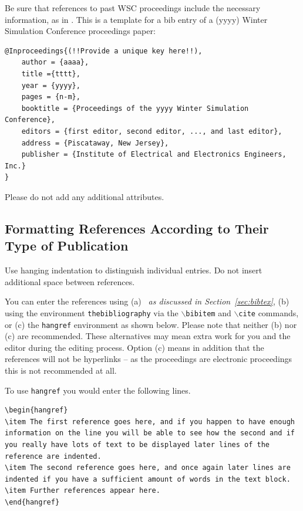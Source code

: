 \documentclass{wscpaperproc}
\theoremstyle{wsc}
\begin{document}
Be sure that references to past WSC proceedings include the necessary information, as in . 
This is a template for a bib entry of a (yyyy) Winter Simulation Conference proceedings paper:\newline

\begin{verbatim}
@Inproceedings{(!!Provide a unique key here!!),
	author = {aaaa},
	title ={tttt},
	year = {yyyy},
	pages = {n-m},
	booktitle = {Proceedings of the yyyy Winter Simulation Conference},
	editors = {first editor, second editor, ..., and last editor},
	address = {Piscataway, New Jersey},
	publisher = {Institute of Electrical and Electronics Engineers, Inc.}
}
\end{verbatim}\vspace{5mm}

Please do not add any additional attributes.


\subsection{Formatting References According to Their Type of Publication}

Use hanging indentation to distinguish individual entries. Do not insert additional space between references.

You can enter the references using (a) {\em \BibTeX\ as discussed in Section~\ref{sec:bibtex}}, (b) using the environment {\tt thebibliography} via the {\tt $\backslash$bibitem} and {\tt $\backslash$cite} commands, or (c) the {\tt hangref} environment as shown below.
Please note that neither (b) nor (c) are recommended. These alternatives may mean extra work for you and the editor during the editing process. Option (c) means in addition that the references will not be hyperlinks -- as the proceedings are electronic proceedings this is not recommended at all.

To use {\tt hangref} you would enter the following lines.\newline

\begin{verbatim}
\begin{hangref}
\item The first reference goes here, and if you happen to have enough 
information on the line you will be able to see how the second and if
you really have lots of text to be displayed later lines of the
reference are indented.
\item The second reference goes here, and once again later lines are
indented if you have a sufficient amount of words in the text block.
\item Further references appear here.
\end{hangref}
\end{verbatim}\vspace{4mm}
\end{document}
